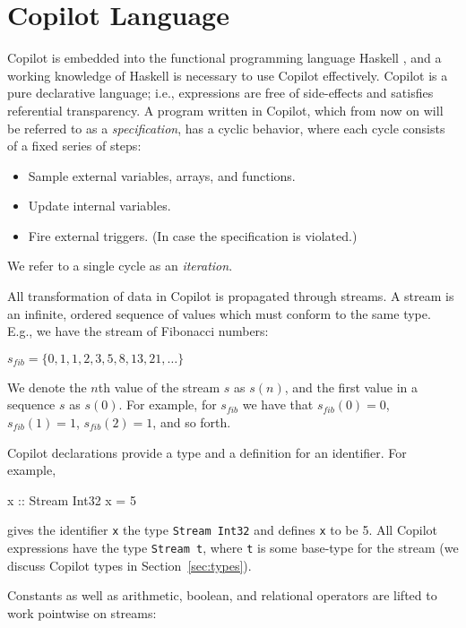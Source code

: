 \section{Copilot Language} 
\label{sec:language}

Copilot is embedded into the functional programming language Haskell
\cite{PeytonJones02}, and a working knowledge of Haskell is necessary to use
Copilot effectively. Copilot is a pure declarative language; i.e., expressions
are free of side-effects and satisfies referential transparency.  A program
written in Copilot, which from now on will be referred to as a
\emph{specification}, has a cyclic behavior, where each cycle consists of a
fixed series of steps:

\begin{itemize}
\item Sample external variables, arrays, and functions.
\item Update internal variables.
\item Fire external triggers. (In case the specification is violated.)
\end{itemize}

\noindent We refer to a single cycle as an \emph{iteration}.

All transformation of data in Copilot is propagated through streams.
A stream is an infinite, ordered sequence of values which must conform to the same type.
E.g., we have the stream of Fibonacci numbers:

\begin{center}
$s_{fib} = \{0, 1, 1, 2, 3, 5, 8, 13, 21, \dots \}$
\end{center}

\noindent We denote the $n$th value of the stream $s$ as $s(n)$, and the first
value in a sequence $s$ as $s(0)$. For example, for $s_{fib}$ we have that $s_{fib}(0) = 0$,
$s_{fib}(1) = 1$, $s_{fib}(2) = 1$, and so forth.

Copilot declarations provide a type and a definition for an identifier.  For
example, 
%
\begin{code}
x :: Stream Int32
x = 5
\end{code}
%
\noindent 
gives the identifier {\tt x} the type {\tt Stream Int32} and defines {\tt x} to
be 5.  All Copilot expressions have the type {\tt Stream t}, where {\tt t} is
some base-type for the stream (we discuss Copilot types in
Section~\ref{sec:types}).

Constants as well as arithmetic, boolean, and relational operators are
lifted to work pointwise on streams:

